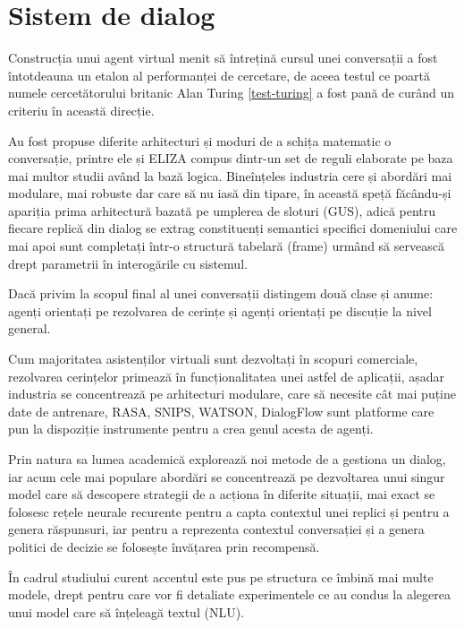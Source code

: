 \chapter{Sistem de dialog}


Construcția unui agent virtual menit să întrețină cursul unei conversații a fost întotdeauna un etalon al performanței de cercetare, de aceea testul ce poartă numele cercetătorului britanic Alan Turing \ref{test-turing} a fost pană de curând un criteriu în această direcție.

Au fost propuse diferite arhitecturi și moduri de a schița matematic o conversație, printre ele și ELIZA compus dintr-un set de reguli elaborate pe baza mai multor studii având la bază logica. Bineînțeles industria cere și abordări mai modulare, mai robuste dar care să nu iasă din tipare, în această speță făcându-și apariția prima arhitectură bazată pe umplerea de sloturi (GUS), adică pentru fiecare replică din dialog se extrag constituenți semantici specifici domeniului care mai apoi sunt completați într-o structură tabelară (frame) urmând să servească drept parametrii în interogările cu sistemul.

Dacă privim la scopul final al unei conversații distingem două clase și anume: agenți orientați pe rezolvarea de cerințe și agenți orientați pe discuție la nivel general.

Cum majoritatea asistenților virtuali sunt dezvoltați în scopuri comerciale, rezolvarea cerințelor primează în funcționalitatea unei astfel de aplicații, așadar industria se concentrează pe arhitecturi modulare, care să necesite cât mai puține date de antrenare, RASA, SNIPS, WATSON, DialogFlow sunt platforme care pun la dispoziție instrumente pentru a crea genul acesta de agenți.

Prin natura sa lumea academică explorează noi metode de a gestiona un dialog, iar acum cele mai populare abordări se concentrează pe dezvoltarea unui singur model care să descopere strategii de a acționa în diferite situații, mai exact se folosesc rețele neurale recurente pentru a capta contextul unei replici și pentru a genera răspunsuri, iar pentru a reprezenta contextul conversației și a genera politici de decizie se folosește învățarea prin recompensă. \cite{rl-seq2seq}

În cadrul studiului curent accentul este pus pe structura ce îmbină mai multe modele, drept pentru care vor fi detaliate experimentele ce au condus la alegerea unui model care să înțeleagă textul (NLU).

